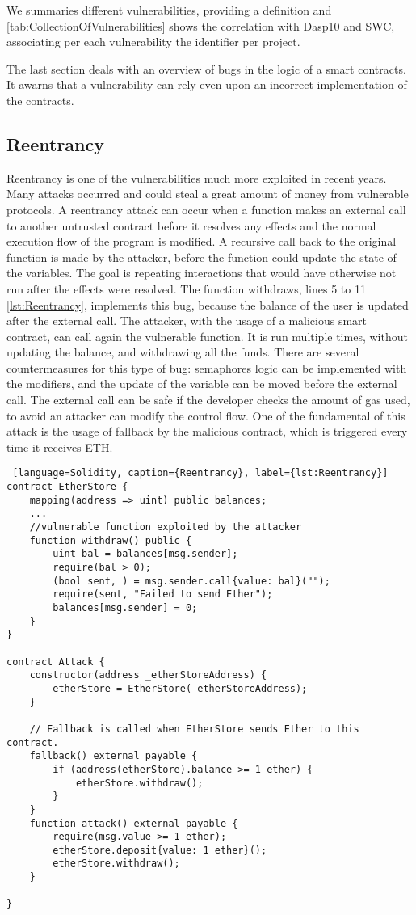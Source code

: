 \documentclass[a4paper,sigconf, language=french,
language=german, language=spanish, language=english]{acmart}
\begin{document}
We summaries different vulnerabilities, providing a definition and \autoref{tab:CollectionOfVulnerabilities} shows the correlation with Dasp10 and SWC, associating per each vulnerability the identifier per project.

The last section deals with an overview of bugs in the logic of a smart contracts. It awarns that a vulnerability can rely even upon an incorrect implementation of the contracts.

\subsection{Reentrancy} 
Reentrancy is one of the vulnerabilities much more exploited in recent years. 
Many attacks occurred and could steal a great amount of money from vulnerable protocols. 
A reentrancy attack can occur when a function makes an external call to another untrusted contract before it resolves any effects and the normal execution flow of the program is modified.
A recursive call back to the original function is made by the attacker, before 
the function could update the state of the variables. 
The goal is repeating interactions that would have otherwise not run after the effects were resolved. 
The function withdraws, lines 5 to 11 \autoref{lst:Reentrancy}, implements this bug, because the balance of the user is updated after the external call. 
The attacker, with the usage of a malicious smart contract, can call again the vulnerable function. 
It is run multiple times, without updating the balance, and withdrawing all the funds. There are several countermeasures for this type of bug: 
semaphores logic can be implemented with the modifiers, and the update of the variable can be moved before the external call. 
The external call can be safe if the developer checks the amount of gas used, to avoid an attacker can modify the control flow. 
One of the fundamental of this attack is the usage of fallback by the malicious contract, which is triggered every time it receives ETH.

\begin{lstlisting} [language=Solidity, caption={Reentrancy}, label={lst:Reentrancy}]
contract EtherStore {
    mapping(address => uint) public balances;
    ...
    //vulnerable function exploited by the attacker
    function withdraw() public {
        uint bal = balances[msg.sender];
        require(bal > 0);
        (bool sent, ) = msg.sender.call{value: bal}("");
        require(sent, "Failed to send Ether");
        balances[msg.sender] = 0;
    }
}

contract Attack {
    constructor(address _etherStoreAddress) {
        etherStore = EtherStore(_etherStoreAddress);
    }

    // Fallback is called when EtherStore sends Ether to this contract.
    fallback() external payable {
        if (address(etherStore).balance >= 1 ether) {
            etherStore.withdraw();
        }
    }
    function attack() external payable {
        require(msg.value >= 1 ether);
        etherStore.deposit{value: 1 ether}();
        etherStore.withdraw();
    }

}
  
\end{lstlisting}
\end{document}
